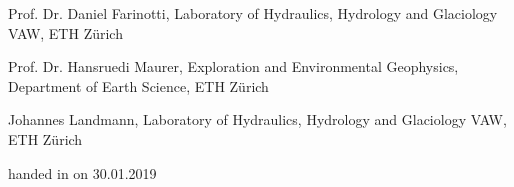 \documentclass[12pt]{article}
\begin{document}
\begin{titlepage}
\begin{center}
        \vspace{0.5cm}

       
        Prof. Dr. Daniel Farinotti, Laboratory of Hydraulics, Hydrology and Glaciology VAW, ETH Zürich
        
        \vspace{0.5cm}
        
        Prof. Dr. Hansruedi  Maurer, Exploration and Environmental Geophysics, Department of Earth Science, ETH Zürich 
        
        \vspace{0.5cm}
        Johannes Landmann, Laboratory of Hydraulics, Hydrology and Glaciology VAW, ETH Zürich     
       
        \vspace{2 cm}


        \vspace{0.5cm}

        handed in on 30.01.2019
 
    \end{center}
\end{titlepage}



\end{document}
